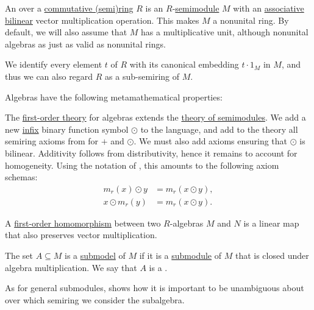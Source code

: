 \begin{definition}\label{def:algebra_over_semiring}\mimprovised
  An  over a \hyperref[def:semiring/commutative]{commutative (semi)ring} \( R \) is an \( R \)-\hyperref[def:semimodule]{semimodule} \( M \) with an \hyperref[def:binary_operation/associative]{associative} \hyperref[def:multilinear_function]{bilinear} vector multiplication operation. This makes \( M \) a nonunital ring. By default, we will also assume that \( M \) has a multiplicative unit, although nonunital algebras as just as valid as nonunital rings.

  We identify every element \( t \) of \( R \) with its canonical embedding \( t \cdot 1_M \) in \( M \), and thus we can also regard \( R \) as a sub-semiring of \( M \).

  Algebras have the following metamathematical properties:
  \begin{thmenum}
     The \hyperref[def:first_order_theory]{first-order theory} for algebras extends the \hyperref[def:semimodule/theory]{theory of semimodules}. We add a new \hyperref[rem:first_order_formula_conventions/infix]{infix} binary function symbol \( \odot \) to the language, and add to the theory all semiring axioms from  for \( + \) and \( \odot \). We must also add axioms ensuring that \( \odot \) is bilinear. Additivity follows from distributivity, hence it remains to account for homogeneity. Using the notation of , this amounts to the following axiom schemas:
    \begin{align*}
      m_r(x) \odot y &= m_r(x \odot y), \\
      x \odot m_r(y) &= m_r(x \odot y).
    \end{align*}

     A \hyperref[def:first_order_homomorphism]{first-order homomorphism} between two \( R \)-algebras \( M \) and \( N \) is a linear map that also preserves vector multiplication.

     The set \( A \subseteq M \) is a \hyperref[def:first_order_submodel]{submodel} of \( M \) if it is a \hyperref[def:monoid/submodel]{submodule} of \( M \) that is closed under algebra multiplication. We say that \( A \) is a .

    As for general submodules,  shows how it is important to be unambiguous about over which semiring we consider the subalgebra.


\end{thmenum}
\end{definition}
